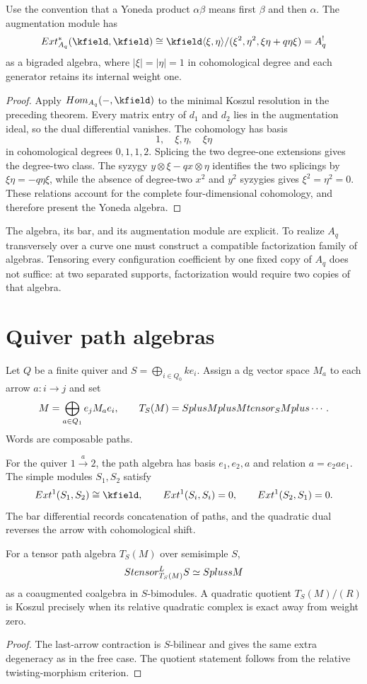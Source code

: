 \begin{theorem}
Use the convention that a Yoneda product $\alpha\beta$ means first $\beta$ and then $\alpha$. The augmentation module has
\[
 \Ext^*_{A_q}(\kfield,\kfield)
 \cong
 \kfield\angles{\xi,\eta}/(\xi^2,\eta^2,\xi\eta+q\eta\xi)
 =A_q^!
\]
as a bigraded algebra, where $|\xi|=|\eta|=1$ in cohomological degree and each generator retains its internal weight one.
\end{theorem}
\begin{proof}
Apply $\Hom_{A_q}(-,\kfield)$ to the minimal Koszul resolution in the preceding theorem. Every matrix entry of $d_1$ and $d_2$ lies in the augmentation ideal, so the dual differential vanishes. The cohomology has basis
\[
 1,\quad \xi,\eta,\quad \xi\eta
\]
in cohomological degrees $0,1,1,2$. Splicing the two degree-one extensions gives the degree-two class. The syzygy $y\otimes\xi-qx\otimes\eta$ identifies the two splicings by
$\xi\eta=-q\eta\xi$, while the absence of degree-two $x^2$ and $y^2$ syzygies gives $\xi^2=\eta^2=0$. These relations account for the complete four-dimensional cohomology, and therefore present the Yoneda algebra.
\end{proof}

The algebra, its bar, and its augmentation module are explicit.
To realize $A_q$ transversely over a curve one must construct a compatible
factorization family of algebras. Tensoring every configuration coefficient by
one fixed copy of $A_q$ does not suffice: at two separated supports,
factorization would require two copies of that algebra.

\section{Quiver path algebras}
Let $Q$ be a finite quiver and $S=\bigoplus_{i\in Q_0}ke_i$. Assign a dg vector space $M_a$ to each arrow $a:i\to j$ and set
\[
 M=\bigoplus_{a\in Q_1}e_jM_ae_i,
 \qquad
 T_S(M)=Splus Mplus Mtensor_S Mplus\cdots.
\]
Words are composable paths.

For the quiver $1\xrightarrow{a}2$, the path algebra has basis $e_1,e_2,a$ and relation $a=e_2ae_1$. The simple modules $S_1,S_2$ satisfy
\[
 \Ext^1(S_1,S_2)\cong\kfield,
 \qquad
 \Ext^1(S_i,S_i)=0,
 \qquad
 \Ext^1(S_2,S_1)=0.
\]
The bar differential records concatenation of paths, and the quadratic dual reverses the arrow with cohomological shift.

\begin{theorem}
For a tensor path algebra $T_S(M)$ over semisimple $S$,
\[
 Stensor_{T_S(M)}^{L}S\simeq Splus sM
\]
as a coaugmented coalgebra in $S$-bimodules. A quadratic quotient $T_S(M)/(R)$ is Koszul precisely when its relative quadratic complex is exact away from weight zero.
\end{theorem}
\begin{proof}
The last-arrow contraction is $S$-bilinear and gives the same extra degeneracy as in the free case. The quotient statement follows from the relative twisting-morphism criterion.
\end{proof}

